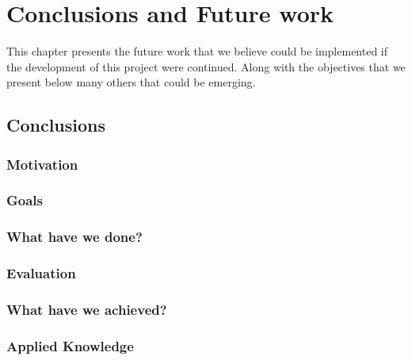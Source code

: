 %
%
\setlength{\parskip}{10pt}
\chapter{Conclusions and Future work}

\begin{resumen}
This chapter presents the future work that we believe could be implemented if the development of this project were continued. Along with the objectives that we present below many others that could be emerging.
\end{resumen}

\section{Conclusions}
\label{cap12:sec:conclusiones}

\subsection{Motivation}
\label{cap12:sec:motivacion}

\subsection{Goals}
\label{cap12:sec:objetivo}

\subsection{What have we done?}
\label{cap12:sec:que hemos realizado}

\subsection{Evaluation}
\label{cap12:sec:evaluacion}

\subsection{What have we achieved?}
\label{cap12:sec:que hemos conseguido}

\subsection{Applied Knowledge}
\label{cap12:sec:conocimientos aplicados}



